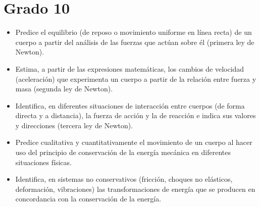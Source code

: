 \section{Grado 10}\label{grado:10}


\evidencias

\begin{itemize}
  \item Predice el equilibrio (de reposo o movimiento uniforme en línea recta) de un cuerpo a partir del análisis de las fuerzas que actúan sobre él (primera ley de Newton).
  \item Estima, a partir de las expresiones matemáticas, los cambios de velocidad (aceleración) que experimenta un cuerpo a partir de la relación entre fuerza y masa (segunda ley de Newton).
  \item Identifica, en diferentes situaciones de interacción entre cuerpos (de forma directa y a distancia), la fuerza de acción y la de reacción e indica sus valores y direcciones (tercera ley de Newton).
\end{itemize}

\ejemplo




\evidencias

\begin{itemize}
  \item Predice cualitativa y cuantitativamente el movimiento de un cuerpo al hacer uso del principio de conservación de la energía mecánica en diferentes situaciones físicas.
  \item Identifica, en sistemas no conservativos (fricción, choques no elásticos, deformación, vibraciones) las transformaciones de energía que se producen en concordancia con la conservación de la energía.
\end{itemize}

\ejemplo



